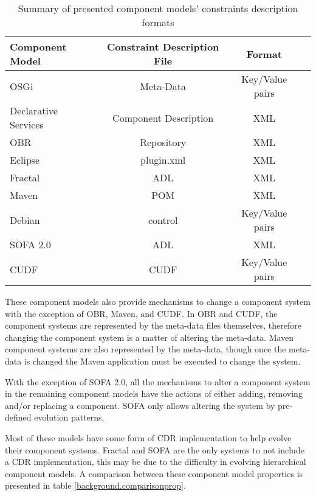 \begin{table}
\begin{tabular}{|l || c | c | c | }
\hline \textbf{Component Model}& \textbf{Constraint Description File} & \textbf{Format}	\\\hline

OSGi					& Meta-Data				& Key/Value pairs 					\\
Declarative Services	& Component Description	& XML 								\\
OBR						& Repository			& XML								\\
Eclipse					& plugin.xml			& XML								\\
Fractal					& ADL					& XML 								\\
Maven					& POM					& XML 									\\
Debian					& control				& Key/Value pairs							\\
SOFA 2.0				& ADL					& XML 							\\
CUDF					& CUDF					& Key/Value pairs									\\\hline
\end{tabular}
\caption{Summary of presented component models' constraints description formats}
\label{background.comparisonmeta}
\end{table}

These component models also provide mechanisms to change a component system with the exception of OBR, Maven, and CUDF.
In OBR and CUDF, the component systems are represented by the meta-data files themselves, therefore changing the component system is a matter of altering the meta-data. 
Maven component systems are also represented by the meta-data, though once the meta-data is changed the Maven application must be executed to change the system.

With the exception of SOFA 2.0, all the mechanisms to alter a component system in the remaining component models have the actions of either adding, removing and/or replacing a component.
SOFA only allows altering the system by pre-defined evolution patterns.

Most of these models have some form of CDR implementation to help evolve their component systems.
Fractal and SOFA are the only systems to not include a CDR implementation, this may be due to the difficulty in evolving hierarchical component models.
A comparison between these component model properties is presented in table \ref{background.comparisonprop}.

